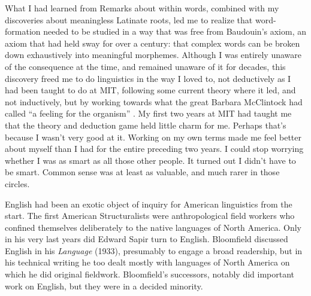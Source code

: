\documentclass[output=paper]{langsci/langscibook}
\begin{document}
What I had learned from Remarks about  within words,
combined with my discoveries about meaningless Latinate roots, led me to
realize that  word-forma\-tion needed to be studied in a way that was free
from Baudouin's axiom, an axiom that had held sway for over a century:
that complex words can be broken down exhaustively into meaningful
morphemes. Although I was entirely unaware of the consequence at the
time, and remained unaware of it for decades, this discovery freed me to
do linguistics in the way I loved to, not deductively as I had been
taught to do at MIT, following some current theory where it led, and not
inductively, but by working towards what the great Barbara McClintock
had called ``a feeling for the organism'' %
\citep{Keller83}%
%
. My first two
years at MIT had taught me that the theory and deduction game held
little charm for me. Perhaps that's because I wasn't very good at it.
Working on my own terms made me feel better about myself than I had for
the entire preceding two years. I could stop worrying whether I was as
smart as all those other people. It turned out I didn't have to be
smart. Common sense was at least as valuable, and much rarer in those
circles.

English had been an exotic object of inquiry for American linguistics
from the start. The first American Structuralists were anthropological
field workers who confined themselves deliberately to the native
languages of North America. Only in his very last years did Edward Sapir
turn to English. Bloomfield discussed English in his \emph{Language}
(1933), presumably to engage a broad readership, but in his technical
writing he too dealt mostly with languages of North America on which he
did original fieldwork. Bloomfield's successors, notably %
\citet{Trager51} %
%
%
 did important work on English, but they were in a decided
minority.
\end{document}
